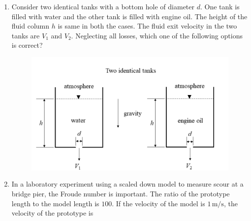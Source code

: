 \documentclass[journal]{IEEEtran}
\begin{document}
\begin{enumerate}[leftmargin=0pt]
\item
Consider two identical tanks with a bottom hole of diameter $d$. One tank is filled with water and the other tank is filled with engine oil. The height of the fluid column $h$ is same in both the cases. The fluid exit velocity in the two tanks are $V_1$ and $V_2$. Neglecting all losses, which one of the following options is correct?
\begin{figure}[H]\includegraphics[width=0.5\columnwidth]{Figs/image (96).png}\caption*{}\label{fig:q16}\end{figure}
\vspace{0.2cm}
\begin{enumerate}
\end{enumerate}
\hfill{}

\item
In a laboratory experiment using a scaled down model to measure scour at a bridge pier, the Froude number is important. The ratio of the prototype length to the model length is $100$. If the velocity of the model is $1\,\text{m/s}$, the velocity  of the prototype is

\vspace{0.2cm}
\begin{enumerate}
\end{enumerate}
\hfill{}


\end{enumerate}
\end{document}
